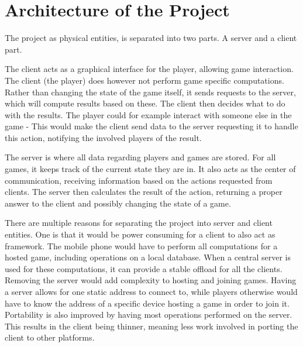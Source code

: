 \section{Architecture of the Project}
%
%

The project as physical entities, is separated into two parts. A server and a client part.

The client acts as a graphical interface for the player, allowing game interaction.
The client (the player) does however not perform game specific computations. Rather than changing the state of the game itself, it sends requests to the server, which will compute results based on these. The client then decides what to do with the results. The player could for example interact with someone else in the game - This would make the client send data to the server requesting it to handle this action, notifying the involved players of the result.

The server is where all data regarding players and games are stored. For all games, it keeps track of the current state they are in. It also acts as the center of communication, receiving information based on the actions requested from clients. The server then calculates the result of the action, returning a proper answer to the client and possibly changing the state of a game.

There are multiple reasons for separating the project into server and client entities. One is that it would be power consuming for a client to also act as framework. The mobile phone would have to perform all computations for a hosted game, including operations on a local database. When a central server is used for these computations, it can provide a stable offload for all the clients. Removing the server would add complexity to hosting and joining games. Having a server allows for one static address to connect to, while players otherwise would have to know the address of a specific device hosting a game in order to join it.
Portability is also improved by having most operations performed on the server. This results in the client being thinner, meaning less work involved in porting the client to other platforms.